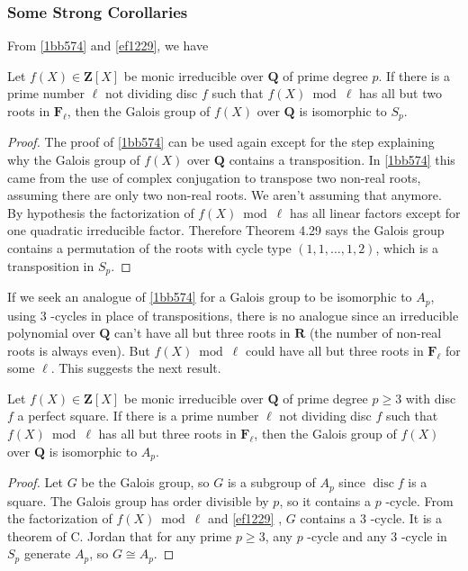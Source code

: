 \subsubsection{Some Strong Corollaries}

From \cref{1bb574} and \cref{ef1229}, we have

\begin{corollary}
Let $f(X) \in \mathbf{Z}[X]$ be monic irreducible over $\mathbf{Q}$ of prime degree $p$. If there is a prime number $\ell$ not dividing disc $f$ such that $f(X) \bmod \ell$ has all but two roots in $\mathbf{F}_{\ell}$, then the Galois group of $f(X)$ over $\mathbf{Q}$ is isomorphic to $S_p$.\label{8c6166}
\end{corollary}

\begin{proof}
The proof of  \cref{1bb574}  can be used again except for the step explaining why the Galois group of $f(X)$ over $\mathbf{Q}$ contains a transposition. In  \cref{1bb574}  this came from the use of complex conjugation to transpose two non-real roots, assuming there are only two non-real roots. We aren't assuming that anymore. By hypothesis the factorization of $f(X) \bmod \ell$ has all linear factors except for one quadratic irreducible factor. Therefore Theorem 4.29 says the Galois group contains a permutation of the roots with cycle type $(1,1, \ldots, 1,2)$, which is a transposition in $S_p$.
\end{proof}

If we seek an analogue of \cref{1bb574} for a Galois group to be isomorphic to $A_p$, using 3 -cycles in place of transpositions, there is no analogue since an irreducible polynomial over $\mathbf{Q}$ can't have all but three roots in $\mathbf{R}$ (the number of non-real roots is always even). But $f(X) \bmod \ell$ could have all but three roots in $\mathbf{F}_{\ell}$ for some $\ell$. This suggests the next result.

\begin{corollary}
Let $f(X) \in \mathbf{Z}[X]$ be monic irreducible over $\mathbf{Q}$ of prime degree $p \geq 3$ with disc $f$ a perfect square. If there is a prime number $\ell$ not dividing disc $f$ such that $f(X) \bmod \ell$ has all but three roots in $\mathbf{F}_{\ell}$, then the Galois group of $f(X)$ over $\mathbf{Q}$ is isomorphic to $A_p$.\label{0cc046}
\end{corollary}

\begin{proof}
Let $G$ be the Galois group, so $G$ is a subgroup of $A_p$ since $\operatorname{disc} f$ is a square. The Galois group has order divisible by $p$, so it contains a $p$ -cycle. From the factorization of $f(X) \bmod \ell$ and \cref{ef1229} , $G$ contains a 3 -cycle. It is a theorem of C. Jordan that for any prime $p \geq 3$, any $p$ -cycle and any 3 -cycle in $S_p$ generate $A_p$, so $G \cong A_p$.
\end{proof}


